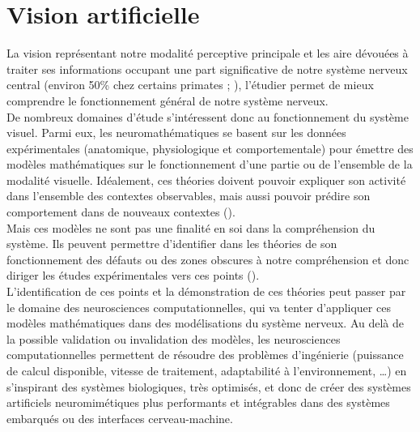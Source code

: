 \section{Vision artificielle}
La vision représentant notre modalité perceptive principale et les aire dévouées à traiter ses informations occupant une part significative de notre système nerveux central (environ 50\% chez certains primates ; \cite{Zhaoping2014}), l'étudier permet de mieux comprendre le fonctionnement général de notre système nerveux.\\
De nombreux domaines d'étude s'intéressent donc au fonctionnement du système visuel. Parmi eux, les neuromathématiques se basent sur les données expérimentales (anatomique, physiologique et comportementale) pour émettre des modèles mathématiques sur le fonctionnement d'une partie ou de l'ensemble de la modalité visuelle. Idéalement, ces théories doivent pouvoir expliquer son activité dans l'ensemble des contextes observables, mais aussi pouvoir prédire son comportement dans de nouveaux contextes (\cite{Zhaoping2014}).\\
Mais ces modèles ne sont pas une finalité en soi dans la compréhension du système. Ils peuvent permettre d'identifier dans les théories de son fonctionnement des défauts ou des zones obscures à notre compréhension et donc diriger les études expérimentales vers ces points (\cite{Zhaoping2014}).\\
L'identification de ces points et la démonstration de ces théories peut passer par le domaine des neurosciences computationnelles, qui va tenter d'appliquer ces modèles mathématiques dans des modélisations du système nerveux. Au delà de la possible validation ou invalidation des modèles, les neurosciences computationnelles permettent de résoudre des problèmes d'ingénierie (puissance de calcul disponible, vitesse de traitement, adaptabilité à l'environnement, \ldots) en s'inspirant des systèmes biologiques, très optimisés, et donc de créer des systèmes artificiels neuromimétiques plus performants et intégrables dans des systèmes embarqués ou des interfaces cerveau-machine.\\

